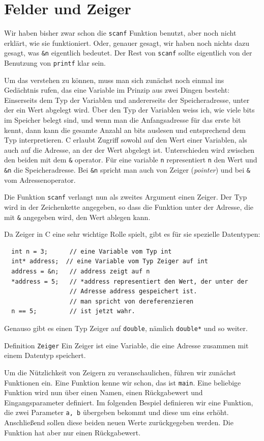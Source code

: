 
\section{Felder und Zeiger}

Wir haben bisher zwar schon die \verb|scanf| Funktion benutzt, aber noch nicht erklärt, wie sie funktioniert. 
Oder, genauer gesagt, wir haben noch nichts dazu gesagt, was \verb|&n| eigentlich bedeutet. 
Der Rest von \verb|scanf| sollte eigentlich von der Benutzung von \verb|printf| klar sein.

Um das verstehen zu können, muss man sich zunächst noch einmal ins Gedächtnis rufen, das eine Variable im Prinzip aus zwei Dingen besteht:
Einserseits dem Typ der Variablen und andererseits der Speicheradresse, unter der ein Wert abgelegt wird.
Über den Typ der Variablen weiss ich, wie viele bits im Speicher belegt sind, und wenn man die Anfangsadresse für das erste bit kennt, dann kann die gesamte Anzahl an bits auslesen und entsprechend dem Typ interpretieren.
C erlaubt Zugriff sowohl auf den Wert einer Variablen, als auch auf die Adresse, an der der Wert abgelegt ist.
Unterschieden wird zwischen den beiden mit dem \verb|&| operator. 
Für eine variable \verb|n| representiert \verb|n| den Wert und \verb|&n| die Speicheradresse.
Bei \verb|&n| spricht man auch von Zeiger (\emph{pointer}) und bei \verb|&| vom Adressenoperator.

Die Funktion \verb|scanf| verlangt nun als zweites Argument einen Zeiger.
Der Typ wird in der Zeichenkette angegeben, so dass die Funktion unter der Adresse, die mit \verb|&| angegeben wird, den Wert ablegen kann.

Da Zeiger in C eine sehr wichtige Rolle spielt, gibt es für sie spezielle Datentypen:
\begin{lstlisting}
  int n = 3;      // eine Variable vom Typ int
  int* address;  // eine Variable vom Typ Zeiger auf int
  address = &n;   // address zeigt auf n
  *address = 5;   // *address representiert den Wert, der unter der
                  // Adresse address gespeichert ist.
                  // man spricht von dereferenzieren
  n == 5;         // ist jetzt wahr.
\end{lstlisting}
Genauso gibt es einen Typ Zeiger auf \verb|double|, nämlich \verb|double*| und so weiter.
\begin{myblock}{Definition \texttt{Zeiger}}
Ein Zeiger ist eine Variable, die eine Adresse zusammen mit einem Datentyp speichert.
\end{myblock}
Um die Nützlichkeit von Zeigern zu veranschaulichen, führen wir zunächst Funktionen ein.
Eine Funktion kenne wir schon, das ist \verb|main|.
Eine beliebige Funktion wird nun über einen Namen, einen Rückgabewert und Eingangsparameter definiert.
Im folgenden Bespiel definieren wir eine Funktion, die zwei Parameter \verb|a, b| übergeben bekommt und diese um eins erhöht. 
Anschließend sollen diese beiden neuen Werte zurückgegeben werden.
Die Funktion hat aber nur einen Rückgabewert.

